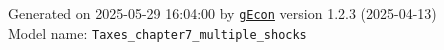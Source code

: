 \documentclass[10pt,a4paper]{article}
\numberwithin{equation}{section}
\begin{document}
\begin{flushleft}{\large
Generated  on 2025-05-29 16:04:00 by \href{http://gecon.r-forge.r-project.org/}{\texttt{gEcon}} version 1.2.3 (2025-04-13)\\
Model name: \verb+Taxes_chapter7_multiple_shocks+
}\end{flushleft}



\end{document}
